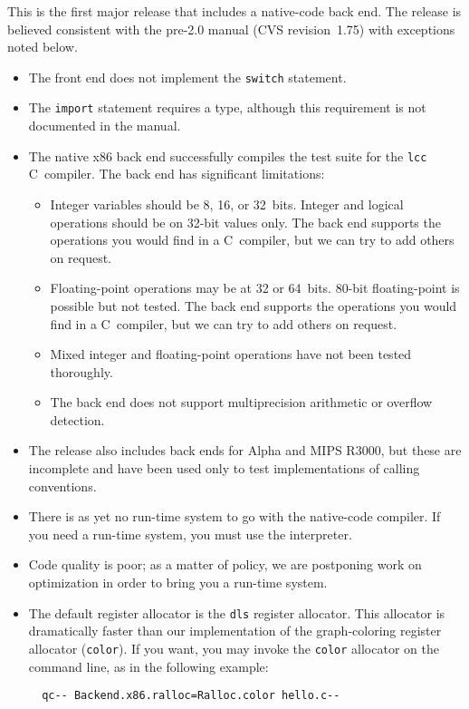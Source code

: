 \documentclass{article}
\begin{document}
This is the first major release that includes a native-code back end.
The release is believed consistent with the pre-2.0 manual (CVS
revision~1.75) with exceptions noted below.
\begin{itemize}
\item
The front end does not implement the \texttt{switch} statement.
\item
The \texttt{import} statement requires a type, although this
requirement is not documented in the manual.
\item
The native x86 back end successfully compiles the test suite
for the \texttt{lcc} C~compiler.
The back end has significant limitations:
\begin{itemize}
\item
Integer variables should be 8, 16, or 32~bits.
Integer and logical operations should be on 32-bit values only.
The back end supports the operations you would find in a C~compiler,
but we can try to add others on request.
\item
Floating-point operations may be at 32 or 64~bits.
80-bit floating-point is possible but not tested.
The back end supports the operations you would find in a C~compiler,
but we can try to add others on request.
\item 
Mixed integer and floating-point operations have not been tested
thoroughly. 
\item
The back end does not support multiprecision arithmetic or overflow
detection. 
\end{itemize}
\item
The release also includes back ends for Alpha and MIPS R3000, but these are
incomplete and have been used only to test implementations of calling
conventions. 
\item
There is as yet no run-time system to go with the native-code
compiler.
If you need a run-time system, you must use the interpreter.
\item
 Code quality is poor; as a matter of policy, we are postponing
       work on optimization in order to bring you a run-time system.
\item
The default register allocator is the \texttt{dls} register allocator.
This allocator is dramatically faster than our implementation of the
graph-coloring register allocator (\texttt{color}).
If you want, you may invoke the \texttt{color} allocator on the
command line, as in the following example:
\begin{verbatim} 
  qc-- Backend.x86.ralloc=Ralloc.color hello.c--
\end{verbatim}
\end{itemize}
\end{document}
